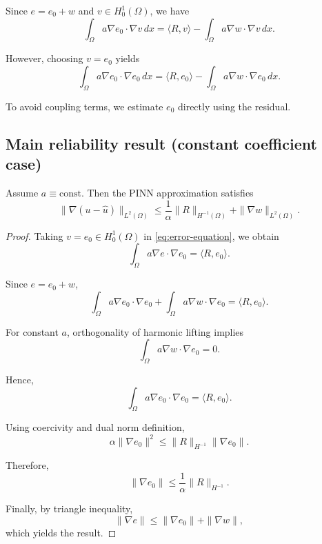 Since $e = e_0 + w$ and $v \in H^1_0(\Omega)$, we have
\[
\int_\Omega a \nabla e_0 \cdot \nabla v \,dx
=
\langle R, v \rangle - \int_\Omega a \nabla w \cdot \nabla v \,dx.
\]

However, choosing $v = e_0$ yields
\begin{equation}\label{eq:error-test}
\int_\Omega a \nabla e_0 \cdot \nabla e_0 \,dx
=
\langle R, e_0 \rangle - \int_\Omega a \nabla w \cdot \nabla e_0 \,dx.
\end{equation}

To avoid coupling terms, we estimate $e_0$ directly using the residual.

\subsection{Main reliability result (constant coefficient case)}

\begin{theorem}\label{thm:main}
Assume $a \equiv \text{const}$. Then the PINN approximation satisfies
\begin{equation}\label{eq:main-bound}
\|\nabla(u - \hat{u})\|_{L^2(\Omega)}
\le
\frac{1}{\alpha}\|R\|_{H^{-1}(\Omega)}
+
\|\nabla w\|_{L^2(\Omega)}.
\end{equation}
\end{theorem}

\begin{proof}

Taking $v = e_0 \in H^1_0(\Omega)$ in \eqref{eq:error-equation}, we obtain
\[
\int_\Omega a \nabla e \cdot \nabla e_0
=
\langle R, e_0 \rangle.
\]

Since $e = e_0 + w$,
\[
\int_\Omega a \nabla e_0 \cdot \nabla e_0
+
\int_\Omega a \nabla w \cdot \nabla e_0
=
\langle R, e_0 \rangle.
\]

For constant $a$, orthogonality of harmonic lifting implies
\[
\int_\Omega a \nabla w \cdot \nabla e_0 = 0.
\]

Hence,
\[
\int_\Omega a \nabla e_0 \cdot \nabla e_0
=
\langle R, e_0 \rangle.
\]

Using coercivity and dual norm definition,
\[
\alpha \|\nabla e_0\|^2
\le
\|R\|_{H^{-1}} \|\nabla e_0\|.
\]

Therefore,
\[
\|\nabla e_0\|
\le
\frac{1}{\alpha} \|R\|_{H^{-1}}.
\]

Finally, by triangle inequality,
\[
\|\nabla e\|
\le
\|\nabla e_0\|
+
\|\nabla w\|,
\]
which yields the result.
\end{proof}

